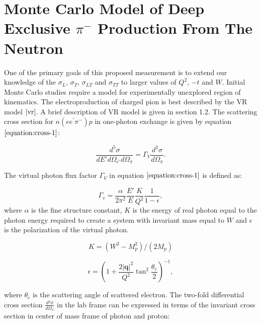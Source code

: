 \documentclass{article}
\begin{document}

\section{Monte Carlo Model of Deep Exclusive $\pi^{-}$ Production From The Neutron}
One of the primary goals of this proposed measurement is to extend our knowledge of the $\sigma_{L}$, $\sigma_{T}$, $\sigma_{LT}$ 
and $\sigma_{TT}$ to larger values of $Q^2$, $-t$ and $W$. Initial Monte Carlo studies require a model for experimentally 
unexplored region of kinematics. The electroproduction of charged pion is best described by the VR model $\cite{vr}$. A brief 
description of VR model is given in section 1.2. The scattering cross section for $n(ee^{\prime}\pi^{-})p$ in one-photon exchange 
is given by equation $\ref{equation:cross-1}$:

\begin{equation}
  \frac{d^{5} \sigma}{dE' d\Omega_{e'} d\Omega_{\pi}} = \Gamma_{V} \frac{d{^2} \sigma}{d\Omega_{\pi}}.
  \label{equation:cross-1}
\end{equation}

The virtual photon flux factor $\Gamma_{V}$ in equation $\ref{equation:cross-1}$ is defined as:

\begin{equation}
  \Gamma_v=\frac{\alpha}{2\pi^2} \frac{E'}{E} \frac{K}{Q^2}\frac{1}{1-\epsilon},
  \label{equation:photon-flux-1}
\end{equation}
where $\alpha$ is the fine structure constant, $K$ is the energy of real photon equal to the photon energy required to create 
a system with invariant mass equal to $W$ and $\epsilon$ is the polarization of the virtual photon. 

\begin{equation}
  K=(W^2-M_p^2)/(2 M_p)
  \label{equation:photon-flux-2}
\end{equation}

\begin{equation}
  \epsilon=\left(1+\frac{2 |\mathbf{q}|^2}{Q^2} \tan^2\frac{\theta_{e}}{2} \right)^{-1},
  \label{equation:photon-flux-3}
\end{equation}

where $\theta_{e}$ is the scattering angle of scattered electron. The two-fold differential cross section 
$\frac{d{^2} \sigma}{d\Omega_{\pi}}$ in the lab frame can be expressed in terms of the invariant cross section in center of 
mass frame of photon and proton:
\end{document}
